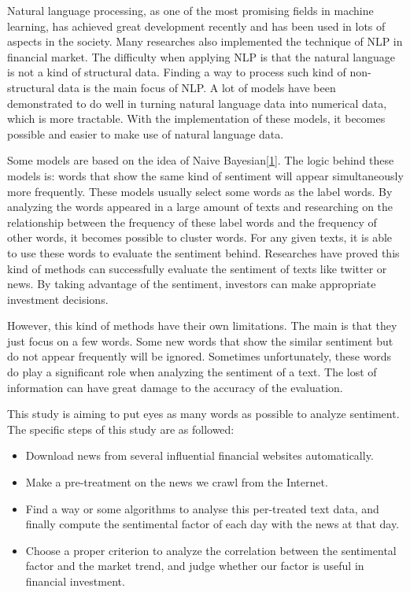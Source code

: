 \documentclass[10pt, conference, compsocconf]{IEEEtran}
\begin{document}
Natural language processing, as one of the most promising fields in machine learning, has achieved great development recently and has been used in lots of aspects in the society. Many researches also implemented the technique of NLP in financial market. The difficulty when applying NLP is that the natural language is not a kind of structural data. Finding a way to process such kind of non-structural data is the main focus of NLP. A lot of models have been demonstrated to do well in turning natural language data into numerical data, which is more tractable. With the implementation of these models, it becomes possible and easier to make use of natural language data.

Some models are based on the idea of Naive Bayesian[\hyperref[ref 1]{1}]. The logic behind these models is: words that show the same kind of sentiment will appear simultaneously more frequently. These models usually select some words as the label words. By analyzing the words appeared in a large amount of texts and researching on the relationship between the frequency of these label words and the frequency of other words, it becomes possible to cluster words. For any given texts, it is able to use these words to evaluate the sentiment behind. Researches have proved this kind of methods can successfully evaluate the sentiment of texts like twitter or news. By taking advantage of the sentiment, investors can make appropriate investment decisions.

However, this kind of methods have their own limitations. The main is that they just focus on a few words. Some new words that show the similar sentiment but do not appear frequently will be ignored. Sometimes unfortunately, these words do play a significant role when analyzing the sentiment of a text. The lost of information can have great damage to the accuracy of the evaluation.


This study is aiming to put eyes as many words as possible to analyze sentiment. The specific steps of this study are as followed:

\begin{itemize}
\item Download news from several influential financial websites automatically.
\item Make a pre-treatment on the news we crawl from the Internet.
\item Find a way or some algorithms to analyse this per-treated text data, and finally compute the sentimental factor of each day with the news at that day.
\item Choose a proper criterion to analyze the correlation between the sentimental factor and the market trend, and judge whether our factor is useful in financial investment.
\end{itemize}
\end{document}
